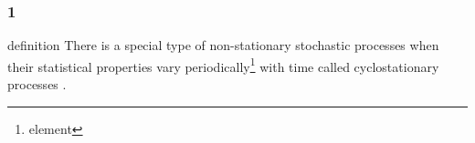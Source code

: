 \documentclass[10pt,xcolor={dvipsnames}]{beamer}
\begin{document}
{
    \begin{frame}
    \frametitle{1}

    \begin{block}{definition}
        There is a special type of non-stationary stochastic 
 processes when their statistical properties vary 
periodically\footnote{element} with time called cyclostationary processes 
.
  \end{block}

\end{frame}
}
\end{document}
